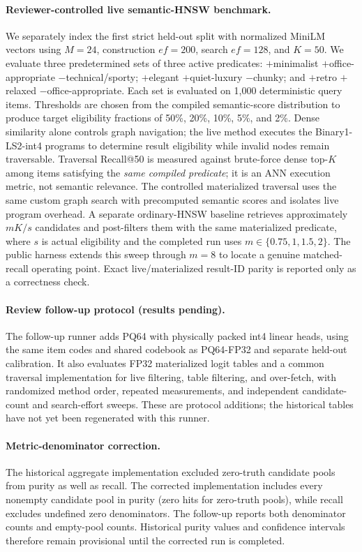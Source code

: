 \paragraph{Reviewer-controlled live semantic-HNSW benchmark.} We separately index the first strict held-out split with normalized MiniLM vectors using $M=24$, construction $ef=200$, search $ef=128$, and $K=50$. We evaluate three predetermined sets of three active predicates: $+$minimalist $+$office-appropriate $-$technical/sporty; $+$elegant $+$quiet-luxury $-$chunky; and $+$retro $+$relaxed $-$office-appropriate. Each set is evaluated on 1,000 deterministic query items. Thresholds are chosen from the compiled semantic-score distribution to produce target eligibility fractions of 50\%, 20\%, 10\%, 5\%, and 2\%. Dense similarity alone controls graph navigation; the live method executes the Binary1-LS2-int4 programs to determine result eligibility while invalid nodes remain traversable. Traversal Recall@50 is measured against brute-force dense top-$K$ among items satisfying the \emph{same compiled predicate}; it is an ANN execution metric, not semantic relevance. The controlled materialized traversal uses the same custom graph search with precomputed semantic scores and isolates live program overhead. A separate ordinary-HNSW baseline retrieves approximately $mK/s$ candidates and post-filters them with the same materialized predicate, where $s$ is actual eligibility and the completed run uses $m\in\{0.75,1,1.5,2\}$. The public harness extends this sweep through $m=8$ to locate a genuine matched-recall operating point. Exact live/materialized result-ID parity is reported only as a correctness check.


\paragraph{Review follow-up protocol (results pending).}
The follow-up runner  adds PQ64 with physically packed int4 linear heads, using the same item codes and shared codebook as PQ64-FP32 and separate held-out calibration. It also evaluates FP32 materialized logit tables and a common traversal implementation for live filtering, table filtering, and over-fetch, with randomized method order, repeated measurements, and independent candidate-count and search-effort sweeps. These are protocol additions; the historical tables have not yet been regenerated with this runner.

\paragraph{Metric-denominator correction.}
The historical aggregate implementation excluded zero-truth candidate pools from purity as well as recall. The corrected implementation includes every nonempty candidate pool in purity (zero hits for zero-truth pools), while recall excludes undefined zero denominators. The follow-up reports both denominator counts and empty-pool counts. Historical purity values and confidence intervals therefore remain provisional until the corrected run is completed.
